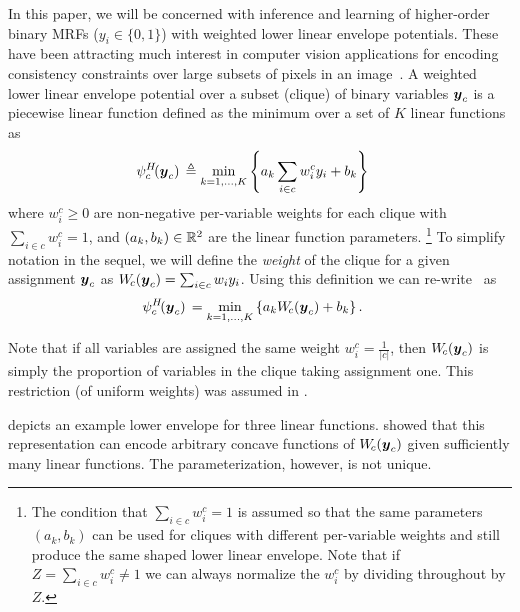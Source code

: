 \documentclass[10pt,journal,letterpaper,compsoc]{IEEEtran}
\renewcommand{\citename}{\citet}
\renewcommand{\cite}{\citep}
\begin{document}
In this paper, we will be concerned with inference and learning of
higher-order binary MRFs (\ie $y_i \in \{0, 1\}$) with weighted lower
linear envelope potentials. These have been attracting much interest
in computer vision applications for encoding consistency constraints
over large subsets of pixels in an image~\cite{Nowozin:2011,
  Lempitsky:ICCV09, Kohli:CVPR07}. A weighted lower linear envelope
potential over a subset (clique) of binary variables ${\boldsymbol{y}}_c$ is a
piecewise linear function defined as the minimum over a set of $K$
linear functions as
%
\begin{align}
  \psi^H_c\!(\by_c) \, &\triangleq \min_{k=1, \ldots, K} 
  \left\{ a_k \sum_{i \in c} w^c_i y_i + b_k \right\}
  \label{eqn:potential}
\end{align}
%
where $w^c_i \geq 0$ are non-negative per-variable weights
for each clique with $\sum_{i \in c} w^c_i = 1$, and $(a_k, b_k) \in
\mathbb{R}^2$ are the linear function parameters.%
%
\footnote{The condition that $\sum_{i \in c} w^c_i = 1$ is assumed so
  that the same parameters $(a_k, b_k)$ can be used for cliques with
  different per-variable weights and still produce the same shaped
  lower linear envelope. Note that if $Z = \sum_{i \in c} w^c_i \neq
  1$ we can always normalize the $w^c_i$ by dividing throughout by $Z$.}
%
To simplify notation in the sequel, we will define the \emph{weight}
of the clique for a given assignment ${\boldsymbol{y}}_c$ as $W_{\!c}({\boldsymbol{y}}_c) =
\sum_{i \in c} w_i y_i$. Using this definition we can
re-write~ as
%
\begin{align}
  \psi^H_c\!(\by_c) \, &= \min_{k=1, \ldots, K} \left\{ a_k W_{\!c}(\by_c) + b_k \right\}.
  \label{eqn:potential2}
\end{align}

Note that if all variables are assigned the same weight $w^c_i =
\frac{1}{|c|}$, then $W_{\!c}({\boldsymbol{y}}_c)$ is simply the proportion of
variables in the clique taking assignment one. This restriction (of
uniform weights) was assumed in \citename{Gould:ICML2011}.

 depicts an example lower envelope for three
linear functions. \citename{Kohli:CVPR10} showed that this
representation can encode arbitrary concave functions of
$W_{\!c}({\boldsymbol{y}}_c)$ given sufficiently many linear functions. The
parameterization, however, is not unique.
\end{document}
